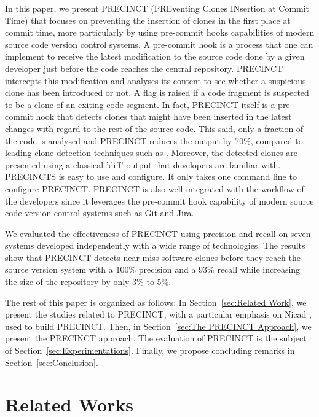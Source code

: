 \documentclass[conference]{IEEEtran}
\begin{document}
In this paper, we present PRECINCT (PREventing Clones INsertion at Commit Time) that focuses on preventing the insertion of clones in the first place at commit time, more particularly by  using pre-commit hooks capabilities of modern source code version control systems. A pre-commit hook is a process that one can implement to receive the latest modification to the source code done by a given developer just before the code reaches the central repository.  PRECINCT intercepts this modification and analyses its  content to see whether a suspicious clone has been introduced or not. A flag is raised if a code fragment is suspected to be a clone of an exiting code segment. In fact, PRECINCT itself is a pre-commit hook that detects clones that might have been inserted in the latest changes with regard to the rest of the source code. This said, only a fraction of the code is analysed and PRECINCT reduces the output by 70\%, compared to leading clone detection techniques such as \cite{Cordy2011}. Moreover, the detected clones are presented using a classical 'diff' output that developers are familiar with.  PRECINCTS is easy to use and configure. It only takes  one command line to configure PRECINCT. PRECINCT is also well integrated with the workflow of the developers since it leverages the pre-commit hook capability of modern source code version control systems such as Git and Jira.

We evaluated the effectiveness of PRECINCT using precision and recall on seven systems developed independently with a wide range of technologies. The results show that PRECINCT detects near-miss software clones before they reach the source version system with a 100\% precision and a 93\% recall while increasing the size of the repository by only 3\% to 5\%.

The rest of this paper is organized as follows: In Section~\ref{sec:Related Work}, we present the studies related to PRECINCT, with a particular emphasis on Nicad \cite{Cordy2011}, used to build PRECINCT. Then, in Section~\ref{sec:The PRECINCT Approach}, we present the PRECINCT approach. The evaluation of PRECINCT is the subject of  Section~\ref{sec:Experimentations}.
Finally, we propose concluding remarks in Section~\ref{sec:Conclusion}.

\section{Related Works}
\label{sec:Related Works}

\cite{Lague}
\end{document}
